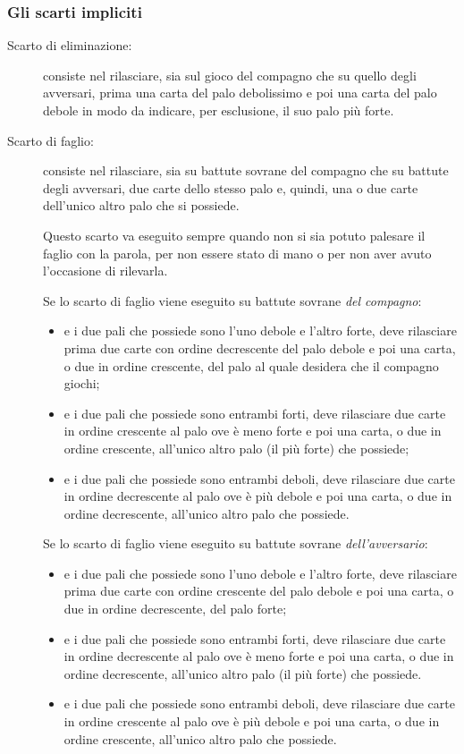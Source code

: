 \documentclass[italian,a4paper]{article}
\newenvironment{packeditem}{
\begin{itemize}
  \setlength{\itemsep}{1pt}
  \setlength{\parskip}{0pt}
  \setlength{\parsep}{0pt}
}{\end{itemize}}
\begin{document}
\subsubsection{Gli scarti impliciti}
\begin{description}
    \item[Scarto di eliminazione:] 
consiste nel rilasciare, sia sul gioco del compagno che su quello degli avversari, prima una carta del palo debolissimo e poi una carta del palo debole in modo da indicare, per esclusione, il suo palo più forte.
    \item[Scarto di faglio:] 
consiste nel rilasciare, sia su battute sovrane del compagno che su battute degli avversari, due carte dello stesso palo e, quindi, una o due carte dell'unico altro palo che si possiede.
 
Questo scarto va eseguito sempre quando non si sia potuto palesare il faglio con la parola, per non essere stato di mano o per non aver avuto l'occasione di rilevarla.
 
Se lo scarto di faglio viene eseguito su battute sovrane
\emph{del compagno}:
\begin{packeditem}
\item e i due pali che possiede sono l'uno debole e l'altro forte, deve rilasciare prima due carte con ordine decrescente del palo debole e poi una carta, o due in ordine crescente, del palo al quale desidera che il compagno giochi;
\item e i due pali che possiede sono entrambi forti, deve rilasciare due carte in ordine crescente al palo ove è meno forte e poi una carta, o due in ordine crescente, all'unico altro palo (il più forte) che possiede;
\item e i due pali che possiede sono entrambi deboli, deve rilasciare due carte in ordine decrescente al palo ove è più debole e poi una carta, o due in ordine decrescente, all'unico altro palo che possiede.
\end{packeditem}
 
Se lo scarto di faglio viene eseguito su battute sovrane
\emph{dell'avversario}:
\begin{packeditem}
\item e i due pali che possiede sono l'uno debole e l'altro forte, deve rilasciare prima due carte con ordine crescente del palo debole e poi una carta, o due in ordine decrescente, del palo forte;
\item e i due pali che possiede sono entrambi forti, deve rilasciare due carte in ordine decrescente al palo ove è meno forte e poi una carta, o due in ordine decrescente, all'unico altro palo (il più forte) che possiede.
\item e i due pali che possiede sono entrambi deboli, deve rilasciare due carte in ordine crescente al palo ove è più debole e poi una carta, o due in ordine crescente, all'unico altro palo che possiede.
\end{packeditem}
 

\end{description}
\end{document}
